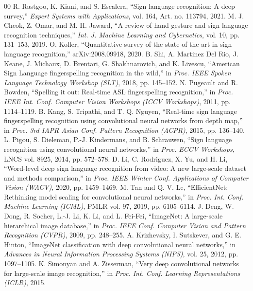 \documentclass[conference]{IEEEtran}
\begin{document}
\begin{thebibliography}{00}
 R. Rastgoo, K. Kiani, and S. Escalera, ``Sign language recognition: A deep survey,'' \emph{Expert Systems with Applications}, vol. 164, Art. no. 113794, 2021.
 M. J. Cheok, Z. Omar, and M. H. Jaward, ``A review of hand gesture and sign language recognition techniques,'' \emph{Int. J. Machine Learning and Cybernetics}, vol. 10, pp. 131--153, 2019.
 O. Koller, ``Quantitative survey of the state of the art in sign language recognition,'' arXiv:2008.09918, 2020.
 B. Shi, A. Martinez Del Rio, J. Keane, J. Michaux, D. Brentari, G. Shakhnarovich, and K. Livescu, ``American Sign Language fingerspelling recognition in the wild,'' in \emph{Proc. IEEE Spoken Language Technology Workshop (SLT)}, 2018, pp. 145--152.
 N. Pugeault and R. Bowden, ``Spelling it out: Real-time ASL fingerspelling recognition,'' in \emph{Proc. IEEE Int. Conf. Computer Vision Workshops (ICCV Workshops)}, 2011, pp. 1114--1119.
 B. Kang, S. Tripathi, and T. Q. Nguyen, ``Real-time sign language fingerspelling recognition using convolutional neural networks from depth map,'' in \emph{Proc. 3rd IAPR Asian Conf. Pattern Recognition (ACPR)}, 2015, pp. 136--140.
 L. Pigou, S. Dieleman, P.-J. Kindermans, and B. Schrauwen, ``Sign language recognition using convolutional neural networks,'' in \emph{Proc. ECCV Workshops}, LNCS vol. 8925, 2014, pp. 572--578.
 D. Li, C. Rodriguez, X. Yu, and H. Li, ``Word-level deep sign language recognition from video: A new large-scale dataset and methods comparison,'' in \emph{Proc. IEEE Winter Conf. Applications of Computer Vision (WACV)}, 2020, pp. 1459--1469.
 M. Tan and Q. V. Le, ``EfficientNet: Rethinking model scaling for convolutional neural networks,'' in \emph{Proc. Int. Conf. Machine Learning (ICML)}, PMLR vol. 97, 2019, pp. 6105--6114.
 J. Deng, W. Dong, R. Socher, L.-J. Li, K. Li, and L. Fei-Fei, ``ImageNet: A large-scale hierarchical image database,'' in \emph{Proc. IEEE Conf. Computer Vision and Pattern Recognition (CVPR)}, 2009, pp. 248--255.
 A. Krizhevsky, I. Sutskever, and G. E. Hinton, ``ImageNet classification with deep convolutional neural networks,'' in \emph{Advances in Neural Information Processing Systems (NIPS)}, vol. 25, 2012, pp. 1097--1105.
 K. Simonyan and A. Zisserman, ``Very deep convolutional networks for large-scale image recognition,'' in \emph{Proc. Int. Conf. Learning Representations (ICLR)}, 2015.

\end{thebibliography}
\end{document}
